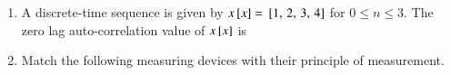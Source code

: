 \documentclass[journal,12pt,onecolumn]{IEEEtran}
\theoremstyle{remark}
\begin{document}
\begin{enumerate}
\item A discrete-time sequence is given by $x\sbrak{x} = \sbrak{1,\, 2,\, 3,\,4}$ for $0 \leq n \leq 3$. The zero lag auto-correlation value of $x\sbrak{x}$ is
\par\hfill{}
    \begin{enumerate}
    \end{enumerate}

\item Match the following measuring devices with their principle of measurement.
\begin{table}[H]
    \centering
     
\end{table}
\par\hfill{}
    \begin{enumerate}
    \end{enumerate}


\end{enumerate}
\end{document}
